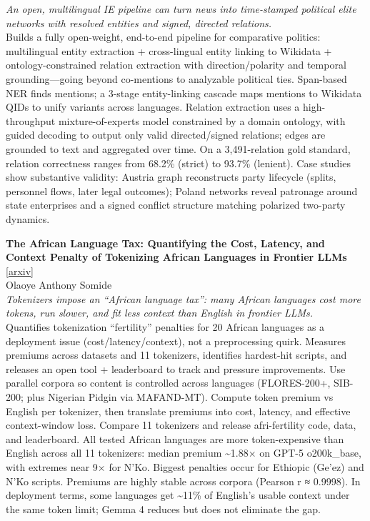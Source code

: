 \documentclass[12pt,letterpaper]{article}
\begin{document}
{\small\textit{An open, multilingual IE pipeline can turn news into time-stamped political elite networks with resolved entities and signed, directed relations.}}\\[1pt]
{\footnotesize Builds a fully open-weight, end-to-end pipeline for comparative politics: multilingual entity extraction + cross-lingual entity linking to Wikidata + ontology-constrained relation extraction with direction/polarity and temporal grounding---going beyond co-mentions to analyzable political ties. Span-based NER finds mentions; a 3-stage entity-linking cascade maps mentions to Wikidata QIDs to unify variants across languages. Relation extraction uses a high-throughput mixture-of-experts model constrained by a domain ontology, with guided decoding to output only valid directed/signed relations; edges are grounded to text and aggregated over time. On a 3,491-relation gold standard, relation correctness ranges from 68.2\% (strict) to 93.7\% (lenient). Case studies show substantive validity: Austria graph reconstructs party lifecycle (splits, personnel flows, later legal outcomes); Poland networks reveal patronage around state enterprises and a signed conflict structure matching polarized two-party dynamics.}

\medskip

{\small\textbf{The African Language Tax: Quantifying the Cost, Latency, and Context Penalty of Tokenizing African Languages in Frontier LLMs}} {\scriptsize[\href{https://arxiv.org/abs/2606.24460}{arxiv}]}\\
{\scriptsize Olaoye Anthony Somide}\\

{\small\textit{Tokenizers impose an ``African language tax'': many African languages cost more tokens, run slower, and fit less context than English in frontier LLMs.}}\\[1pt]
{\footnotesize Quantifies tokenization ``fertility'' penalties for 20 African languages as a deployment issue (cost/latency/context), not a preprocessing quirk. Measures premiums across datasets and 11 tokenizers, identifies hardest-hit scripts, and releases an open tool + leaderboard to track and pressure improvements. Use parallel corpora so content is controlled across languages (FLORES-200+, SIB-200; plus Nigerian Pidgin via MAFAND-MT). Compute token premium vs English per tokenizer, then translate premiums into cost, latency, and effective context-window loss. Compare 11 tokenizers and release afri-fertility code, data, and leaderboard. All tested African languages are more token-expensive than English across all 11 tokenizers: median premium \textasciitilde{}1.88× on GPT-5 o200k\_base, with extremes near 9× for N'Ko. Biggest penalties occur for Ethiopic (Ge'ez) and N'Ko scripts. Premiums are highly stable across corpora (Pearson r ≈ 0.9998). In deployment terms, some languages get \textasciitilde{}11\% of English's usable context under the same token limit; Gemma 4 reduces but does not eliminate the gap.}
\end{document}
